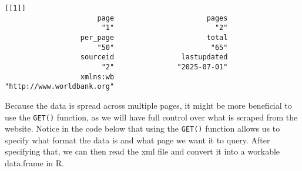 \documentclass[
  letterpaper,
  DIV=11,
  numbers=noendperiod]{scrreprt}
\begin{document}
\begin{verbatim}
[[1]]
                      page                      pages 
                       "1"                        "2" 
                  per_page                      total 
                      "50"                       "65" 
                  sourceid                lastupdated 
                       "2"               "2025-07-01" 
                  xmlns:wb 
"http://www.worldbank.org" 
\end{verbatim}

Because the data is spread across multiple pages, it might be more
beneficial to use the \texttt{GET()} function, as we will have full
control over what is scraped from the website. Notice in the code below
that using the \texttt{GET()} function allows us to specify what format
the data is and what page we want it to query. After specifying that, we
can then read the xml file and convert it into a workable data.frame in
R.
\end{document}
